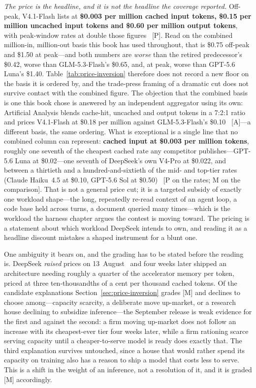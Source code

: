 \emph{The price is the headline, and it is not the headline the coverage reported.} Off-peak, V4.1-Flash lists at \textbf{\$0.003 per million cached input tokens, \$0.15 per million uncached input tokens and \$0.60 per million output tokens}, with peak-window rates at double those figures~\cite{deepseek-v41flash-price} [P]. Read on the combined million-in, million-out basis this book has used throughout, that is \$0.75 off-peak and \$1.50 at peak---and both numbers are \emph{worse} than the retired predecessor's \$0.42, worse than GLM-5.3-Flash's \$0.65, and, at peak, worse than GPT-5.6 Luna's \$1.40. Table~\ref{tab:price-inversion} therefore does not record a new floor on the basis it is ordered by, and the trade-press framing of a dramatic cut does not survive contact with the combined figure. The objection that the combined basis is one this book chose is answered by an independent aggregator using its own: Artificial Analysis blends cache-hit, uncached and output tokens in a 7:2:1 ratio and prices V4.1-Flash at \$0.18 per million against GLM-5.3-Flash's \$0.10~\cite{aa-v41flash} [A]---a different basis, the same ordering. What is exceptional is a single line that no combined column can represent: \textbf{cached input at \$0.003 per million tokens}, roughly one seventh of the cheapest cached rate any competitor publishes---GPT-5.6 Luna at \$0.02---one seventh of DeepSeek's own V4-Pro at \$0.022, and between a thirtieth and a hundred-and-sixtieth of the mid- and top-tier rates (Claude Haiku~4.5 at \$0.10, GPT-5.6 Sol at \$0.50)~\cite{deepseek-v41flash-price} [P on the rates; M on the comparison]. That is not a general price cut; it is a targeted subsidy of exactly one workload shape---the long, repeatedly re-read context of an agent loop, a code base held across turns, a document queried many times---which is the workload the harness chapter argues the contest is moving toward. The pricing is a statement about which workload DeepSeek intends to own, and reading it as a headline discount mistakes a shaped instrument for a blunt one.

One ambiguity it bears on, and the grading has to be stated before the reading is. DeepSeek \emph{raised} prices on 13~August~\cite{deepseek-raise} and four weeks later shipped an architecture needing roughly a quarter of the accelerator memory per token, priced at three ten-thousandths of a cent per thousand cached tokens. Of the candidate explanations Section~\ref{sec:price-inversion} grades [M] and declines to choose among---capacity scarcity, a deliberate move up-market, or a research house declining to subsidize inference---the September release is weak evidence for the first and against the second: a firm moving up-market does not follow an increase with its cheapest-ever tier four weeks later, while a firm rationing scarce serving capacity until a cheaper-to-serve model is ready does exactly that. The third explanation survives untouched, since a house that would rather spend its capacity on training also has a reason to ship a model that costs less to serve. This is a shift in the weight of an inference, not a resolution of it, and it is graded [M] accordingly.


